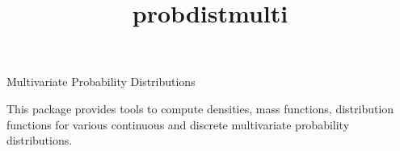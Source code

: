 \documentclass[12pt]{article}
\begin{document}
\begin{titlepage}

\title{probdistmulti}{Multivariate Probability Distributions}


This package provides tools to compute densities, mass functions, 
distribution functions 
for various continuous and discrete multivariate probability distributions.

\vfill
\end{titlepage}


\tableofcontents
{}























%
%
%
%
%



\end{document}
